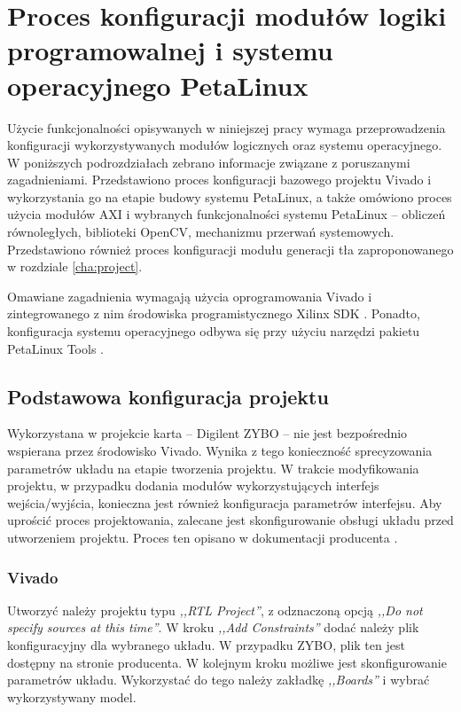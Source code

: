 \chapter{Proces konfiguracji modułów logiki programowalnej i systemu operacyjnego PetaLinux}
\label{cha:vivado-conf}


Użycie funkcjonalności opisywanych w niniejszej pracy wymaga przeprowadzenia konfiguracji wykorzystywanych modułów logicznych oraz systemu operacyjnego. 
W poniższych podrozdziałach zebrano informacje związane z poruszanymi zagadnieniami. Przedstawiono proces konfiguracji bazowego projektu Vivado i wykorzystania go na etapie budowy systemu PetaLinux, a także omówiono proces użycia modułów AXI i wybranych funkcjonalności systemu PetaLinux -- obliczeń równoległych, biblioteki OpenCV, mechanizmu przerwań systemowych. Przedstawiono również proces konfiguracji modułu generacji tła zaproponowanego w rozdziale \ref{cha:project}.%

Omawiane zagadnienia wymagają użycia oprogramowania Vivado \cite{vivado-home} i zintegrowanego z nim środowiska programistycznego Xilinx SDK \cite{xsdk-home}. Ponadto, konfiguracja systemu operacyjnego odbywa się przy użyciu narzędzi pakietu PetaLinux Tools \cite{petalinux-tools}.

\section{Podstawowa konfiguracja projektu}

Wykorzystana w projekcie karta -- Digilent ZYBO -- nie jest bezpośrednio wspierana przez środowisko Vivado. %
Wynika z tego konieczność sprecyzowania parametrów układu na etapie tworzenia projektu. 
W trakcie modyfikowania projektu, w przypadku dodania modułów wykorzystujących interfejs wejścia/wyjścia, konieczna jest również konfiguracja parametrów interfejsu. 
Aby uprościć proces projektowania, zalecane jest skonfigurowanie obsługi układu przed utworzeniem projektu. 
Proces ten opisano w dokumentacji producenta \cite{zybo-in-vivado}.

\subsection{Vivado}
\label{sec:vivado-conf}
Utworzyć należy projektu typu \emph{,,RTL Project''}, z odznaczoną opcją \emph{,,Do not specify sources at this time''}.
W kroku \emph{,,Add Constraints''} dodać należy plik konfiguracyjny dla wybranego układu. 
W przypadku ZYBO, plik ten jest dostępny na stronie producenta. 
W kolejnym kroku możliwe jest skonfigurowanie parametrów układu. 
Wykorzystać do tego należy zakładkę \emph{,,Boards''} i wybrać wykorzystywany model.

